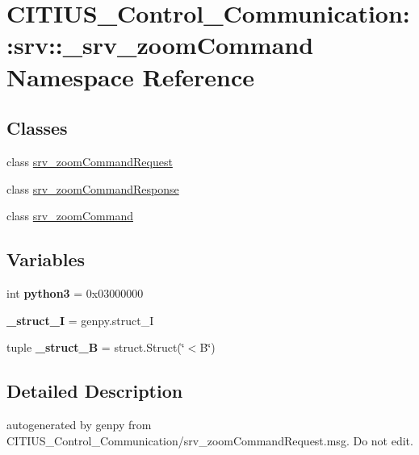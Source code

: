 \hypertarget{namespace_c_i_t_i_u_s___control___communication_1_1srv_1_1__srv__zoom_command}{\section{\-C\-I\-T\-I\-U\-S\-\_\-\-Control\-\_\-\-Communication\-:\-:srv\-:\-:\-\_\-srv\-\_\-zoom\-Command \-Namespace \-Reference}
\label{namespace_c_i_t_i_u_s___control___communication_1_1srv_1_1__srv__zoom_command}
}
\subsection*{\-Classes}
\begin{DoxyCompactItemize}
\item 
class \hyperlink{class_c_i_t_i_u_s___control___communication_1_1srv_1_1__srv__zoom_command_1_1srv__zoom_command_request}{srv\-\_\-zoom\-Command\-Request}
\item 
class \hyperlink{class_c_i_t_i_u_s___control___communication_1_1srv_1_1__srv__zoom_command_1_1srv__zoom_command_response}{srv\-\_\-zoom\-Command\-Response}
\item 
class \hyperlink{class_c_i_t_i_u_s___control___communication_1_1srv_1_1__srv__zoom_command_1_1srv__zoom_command}{srv\-\_\-zoom\-Command}
\end{DoxyCompactItemize}
\subsection*{\-Variables}
\begin{DoxyCompactItemize}
\item 
\hypertarget{namespace_c_i_t_i_u_s___control___communication_1_1srv_1_1__srv__zoom_command_ab6dbe020866a4a0774a196983e3802ed}{int {\bfseries python3} = 0x03000000}\label{namespace_c_i_t_i_u_s___control___communication_1_1srv_1_1__srv__zoom_command_ab6dbe020866a4a0774a196983e3802ed}

\item 
\hypertarget{namespace_c_i_t_i_u_s___control___communication_1_1srv_1_1__srv__zoom_command_ae741cf4be3870ecaa6fc580c3b351d43}{{\bfseries \-\_\-struct\-\_\-\-I} = genpy.\-struct\-\_\-\-I}\label{namespace_c_i_t_i_u_s___control___communication_1_1srv_1_1__srv__zoom_command_ae741cf4be3870ecaa6fc580c3b351d43}

\item 
\hypertarget{namespace_c_i_t_i_u_s___control___communication_1_1srv_1_1__srv__zoom_command_a74828d41fe7a7381195bb53995055764}{tuple {\bfseries \-\_\-struct\-\_\-\-B} = struct.\-Struct(\char`\"{}$<$\-B\char`\"{})}\label{namespace_c_i_t_i_u_s___control___communication_1_1srv_1_1__srv__zoom_command_a74828d41fe7a7381195bb53995055764}

\end{DoxyCompactItemize}


\subsection{\-Detailed \-Description}
\begin{DoxyVerb}autogenerated by genpy from CITIUS_Control_Communication/srv_zoomCommandRequest.msg. Do not edit.\end{DoxyVerb}
 